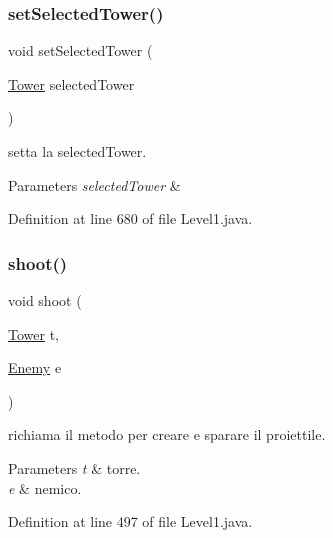 \subsubsection{\texorpdfstring{set\+Selected\+Tower()}{setSelectedTower()}}
{\footnotesize\ttfamily void set\+Selected\+Tower (\begin{DoxyParamCaption}\item[{\hyperlink{classtowers_1_1_tower}{Tower}}]{selected\+Tower }\end{DoxyParamCaption})}



setta la selected\+Tower. 


\begin{DoxyParams}{Parameters}
{\em selected\+Tower} & \\
\hline
\end{DoxyParams}


Definition at line 680 of file Level1.\+java.

\mbox{\label{classscenes_1_1_level1_a200b073564fc341f34b6112718742bae}} 
\subsubsection{\texorpdfstring{shoot()}{shoot()}}
{\footnotesize\ttfamily void shoot (\begin{DoxyParamCaption}\item[{\hyperlink{classtowers_1_1_tower}{Tower}}]{t,  }\item[{\hyperlink{classenemies_1_1_enemy}{Enemy}}]{e }\end{DoxyParamCaption})}



richiama il metodo per creare e sparare il proiettile. 


\begin{DoxyParams}{Parameters}
{\em t} & torre. \\
\hline
{\em e} & nemico. \\
\hline
\end{DoxyParams}


Definition at line 497 of file Level1.\+java.

